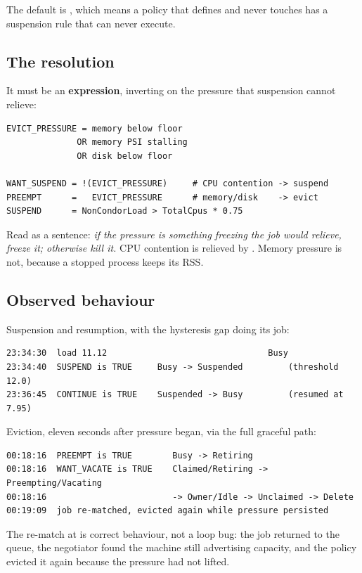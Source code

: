 The default is , which means a policy that defines  and
never touches  has a suspension rule that can never execute.

\subsection{The resolution}

It must be an \textbf{expression}, inverting on the pressure that suspension
cannot relieve:

\begin{lstlisting}
EVICT_PRESSURE = memory below floor
              OR memory PSI stalling
              OR disk below floor

WANT_SUSPEND = !(EVICT_PRESSURE)     # CPU contention -> suspend
PREEMPT      =   EVICT_PRESSURE      # memory/disk    -> evict
SUSPEND      = NonCondorLoad > TotalCpus * 0.75
\end{lstlisting}

Read as a sentence: \emph{if the pressure is something freezing the job would
relieve, freeze it; otherwise kill it.} CPU contention is relieved by
. Memory pressure is not, because a stopped process keeps its RSS.

\subsection{Observed behaviour}

Suspension and resumption, with the hysteresis gap doing its job:

\begin{lstlisting}[style=term]
23:34:30  load 11.12                                Busy
23:34:40  SUSPEND is TRUE     Busy -> Suspended         (threshold 12.0)
23:36:45  CONTINUE is TRUE    Suspended -> Busy         (resumed at 7.95)
\end{lstlisting}

Eviction, eleven seconds after pressure began, via the full graceful path:

\begin{lstlisting}[style=term]
00:18:16  PREEMPT is TRUE        Busy -> Retiring
00:18:16  WANT_VACATE is TRUE    Claimed/Retiring -> Preempting/Vacating
00:18:16                         -> Owner/Idle -> Unclaimed -> Delete
00:19:09  job re-matched, evicted again while pressure persisted
\end{lstlisting}

The re-match at  is correct behaviour, not a loop bug: the job
returned to the queue, the negotiator found the machine still advertising
capacity, and the policy evicted it again because the pressure had not lifted.

